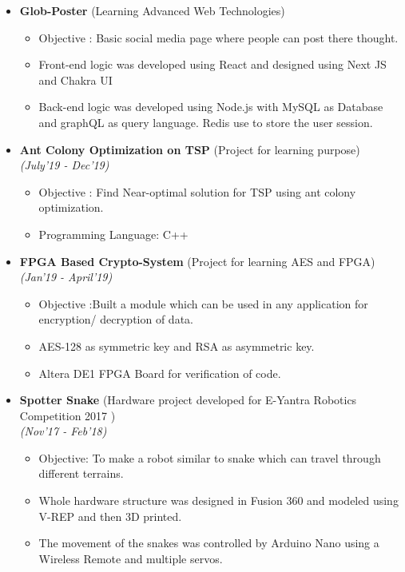 \documentclass[a4paper,10pt]{article}
\newcommand{\isep}{-2 pt}
\begin{document}
\begin{itemize}

\item \textbf{Glob-Poster} (Learning Advanced Web Technologies) \\[-0.6cm]
	\begin{itemize}\itemsep \isep
	\item Objective : Basic social media page where people can post there thought.
	\item Front-end logic was developed using React and designed using Next JS and Chakra UI 
	\item Back-end logic was developed using Node.js  with MySQL as Database and graphQL as query language. Redis use to store the user session.
	\end{itemize}


\item \textbf{Ant Colony Optimization on TSP} (Project for learning purpose) \\
\emph{(July'19 - Dec'19)} \\[-0.6cm]
	\begin{itemize}\itemsep \isep
	\item Objective : Find Near-optimal solution for TSP using ant colony optimization.
	\item Programming Language: C++
	\end{itemize}

\item \textbf{FPGA Based Crypto-System} (Project for learning AES and FPGA) \\
\emph{(Jan'19 - April'19)} \\[-0.6cm]
	\begin{itemize}\itemsep \isep
	\item Objective :Built a module which can be used in any application for encryption/ decryption of data.
	\item AES-128 as symmetric key and RSA as asymmetric key. 
	\item Altera DE1 FPGA Board for verification of code. 
	\end{itemize}
	
\item \textbf{Spotter Snake
} (Hardware project developed for E-Yantra Robotics Competition 2017
) \\
 \emph{(Nov'17 - Feb'18)} \\[-0.6cm]
	\begin{itemize}\itemsep \isep
	\item Objective: To make a robot similar to snake which can travel through different terrains.
	\item Whole hardware structure was designed in Fusion 360 and modeled using V-REP and then 3D printed.
	\item The movement of the snakes was controlled by Arduino Nano using a Wireless Remote and multiple servos.
	\end{itemize}


\end{itemize}
\end{document}

